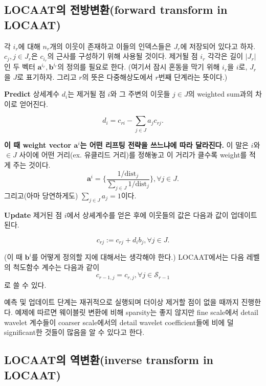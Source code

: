 \documentclass[b5paper,]{scrbook}
\theoremstyle{plain}
\theoremstyle{definition}
\numberwithin{equation}{section}
\begin{document}
\subsection{LOCAAT의 전방변환(forward transform in
LOCAAT)}\label{locaat-forward-transform-in-locaat}

각 \(i_{r}\)에 대해 \(n_{r}\)개의 이웃이 존재하고 이들의 인덱스들은
\(J_{r}\)에 저장되어 있다고 하자. \(c_{j}, j\in J_{r}\)은
\(c_{i_{r}}\)의 근사를 구성하기 위해 사용될 것이다. 제거될 점 \(i_{r}\)
각각은 길이 \(|J_{r}|\)인 두 벡터
\(\mathbf{a}^{i_{r}}, \mathbf{b}^{i_{r}}\)의 정의를 필요로 한다. (여기서
잠시 혼동을 막기 위해 \(i_{r}\)을 \(i\)로, \(J_{r}\)을 \(J\)로 표기하자.
그리고 \(r\)의 뜻은 다중해상도에서 \(r\)번째 단계라는 뜻이다.)

\textbf{Predict} 상세계수 \(d_{i}\)는 제거될 점 \(i\)와 그 주변의 이웃들
\(j\in J\)의 weighted sum과의 차이로 얻어진다.

\begin{equation}\label{eq:LOCAATforwardpre}
d_{i}=c_{ri}-\sum_{j\in J}a_{j}c_{rj}.
\end{equation}

\textbf{이 때 weight vector \(\mathbf{a}^{i}\)는 어떤 리프팅 전략을
쓰느냐에 따라 달라진다.} 이 말은 \(i\)와 \(\in J\) 사이에 어떤 거리(ex.
유클리드 거리)를 정해놓고 이 거리가 클수록 weight를 적게 주는 것이다.
\[\mathbf{a}^{i}=\{ \frac{1/\text{dist}_{j}}{\sum_{j\in J}1/\text{dist}_{j}}\}, \forall j\in J.\]
그리고(아마 당연하게도) \(\sum_{j\in J} a_{j}=1\)이다.

\textbf{Update} 제거된 점 \(i\)에서 상셰계수를 얻은 후에 이웃들의 값은
다음과 값이 업데이트된다.

\begin{equation}\label{eq:LOCAATforwardup}
c_{rj}:=c_{rj}+d_{i}b_{j},\forall j\in J.
\end{equation}

(이 때 \(\mathbf{b}^{i}\)를 어떻게 정의할 지에 대해서는 생각해야 한다.)
LOCAAT에서는 다음 레벨의 척도함수 계수는 다음과 같이
\[c_{r-1,j}=c_{r,j},\forall j \in \mathcal{S}_{r-1}\] 로 쓸 수 있다.

예측 및 업데이트 단계는 재귀적으로 실행되며 더이상 제거할 점이 없을
때까지 진행한다. 예제에 따르면 웨이블릿 변환에 비해 sparsity는 좋지
않지만 fine scale에서 detail wavelet 계수들이 coarser scale에서의 detail
wavelet coefficient들에 비에 덜 significant한 것들이 많음을 알 수 있다고
한다.

\subsection{LOCAAT의 역변환(inverse transform in
LOCAAT)}\label{locaat-inverse-transform-in-locaat}
\end{document}
